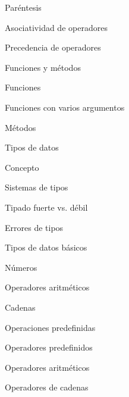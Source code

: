 \begin{longenum}
\begin{longenum}
\begin{longenum}
\begin{longenum}
                \item Paréntesis
                \item Asociatividad de operadores
                \item Precedencia de operadores
            \end{longenum}
            \item Funciones y métodos
            \begin{longenum}
                \item Funciones
                \item Funciones con varios argumentos
                \item Métodos
            \end{longenum}
            \item Tipos de datos
            \begin{longenum}
                \item Concepto
                \begin{longenum}
                    \item Sistemas de tipos
                    \item Tipado fuerte vs. débil
                    \item Errores de tipos
                \end{longenum}
                \item Tipos de datos básicos
                \begin{longenum}
                    \item Números
                    \begin{longenum}
                        \item Operadores aritméticos
                    \end{longenum}
                    \item Cadenas
                \end{longenum}
            \end{longenum}
            \item Operaciones predefinidas
            \begin{longenum}
                \item Operadores predefinidos
                \begin{longenum}
                    \item Operadores aritméticos
                    \item Operadores de cadenas
                \end{longenum}

\end{longenum}
\end{longenum}
\end{longenum}
\end{longenum}
